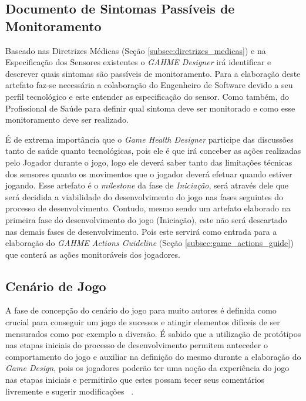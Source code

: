 \subsection{Documento de Sintomas Passíveis de Monitoramento}
Baseado nas Diretrizes Médicas (Seção \ref{subsec:diretrizes_medicas}) e na Especificação dos Sensores existentes o \textit{GAHME Designer} irá identificar e descrever quais sintomas são passíveis de monitoramento. Para a elaboração deste artefato faz-se necessária a colaboração do Engenheiro de Software devido a seu perfil tecnológico e este entender as especificação do sensor. Como também, do Profissional de Saúde para definir qual sintoma deve ser monitorado e como esse monitoramento deve ser realizado.

É de extrema importância que o \textit{Game Health Designer} participe das discussões tanto de saúde quanto tecnológicas, pois ele é que irá conceber as ações realizadas pelo Jogador durante o jogo, logo ele deverá saber tanto das limitações técnicas dos sensores quanto os movimentos que o jogador deverá efetuar quando estiver jogando. Esse artefato é o \textit{milestone} da fase de \textit{Iniciação}, será através dele que será decidida a viabilidade do desenvolvimento do jogo nas fases seguintes do processo de desenvolvimento. Contudo, mesmo sendo um artefato elaborado na primeira fase do desenvolvimento do jogo (Iniciação), este não será descartado nas demais fases de desenvolvimento. Pois este servirá como entrada para a elaboração do \textit{GAHME Actions Guideline} (Seção \ref{subsec:game_actions_guide}) que conterá as ações monitoráveis dos jogadores.

\subsection{Cenário de Jogo}
A fase de concepção do cenário do jogo para muito autores é definida como crucial para conseguir um jogo de sucessos e atingir elementos difíceis de ser mensurados como por exemplo a diversão. É sabido que a utilização de protótipos nas etapas iniciais do processo de desenvolvimento permitem anteceder o comportamento do jogo e auxiliar na definição do mesmo durante a elaboração do \textit{Game Design}, pois os jogadores poderão ter uma noção da experiência do jogo nas etapas iniciais e permitirão que estes possam tecer seus comentários livremente e sugerir modificações ~\cite{prototipgames2007}.
 
